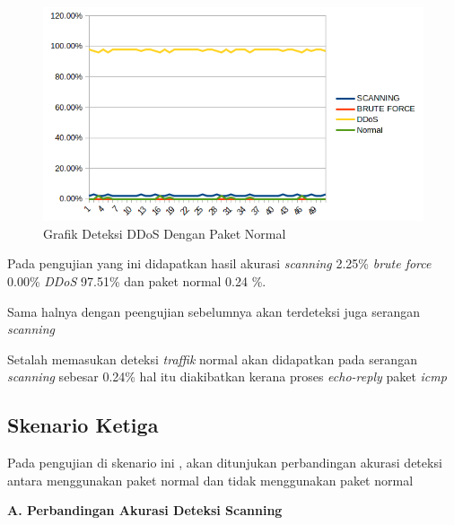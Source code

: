 	\begin{figure}[H]
		\centering
		\includegraphics[scale=0.9]{gambar/ddosnormal1}
		\caption{Grafik Deteksi DDoS Dengan Paket Normal}
		\label{Grafik DDos Force Dengan  Paket Normal}
	\end{figure}
	
	
	
	Pada pengujian yang ini didapatkan hasil akurasi \emph{scanning} 2.25\% \emph{brute force} 0.00\% \emph{DDoS} 97.51\% dan paket normal 0.24 \%.
	
	Sama halnya dengan peengujian sebelumnya akan terdeteksi juga serangan \emph{scanning}
	
	Setalah memasukan deteksi \emph{traffik} normal akan didapatkan pada serangan \emph{scanning} sebesar 0.24\% hal itu diakibatkan kerana proses \emph{echo-reply} paket \emph{icmp}
	
	
	
	\newpage
	\subsection{Skenario Ketiga}
	Pada pengujian di skenario ini , akan ditunjukan perbandingan akurasi deteksi antara menggunakan paket normal dan tidak menggunakan paket normal 
	
	\noindent
	\textbf{A. Perbandingan Akurasi Deteksi Scanning }
	
